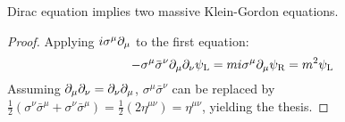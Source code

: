 \begin{proposition}{}{}
  Dirac equation implies two massive Klein-Gordon equations.
\end{proposition}

\begin{proofbox}
  \begin{proof}
    Applying $ i \sigma^\mu \partial_\mu $ to the first equation:
    \begin{equation*}
      - \sigma^\mu \bar{\sigma}^\nu \partial_\mu \partial_\nu \psi_\text{L} = m i \sigma^\mu \partial_\mu \psi_\text{R} = m^2 \psi_\text{L}
    \end{equation*}
    Assuming $ \partial_\mu \partial_\nu = \partial_\nu \partial_\mu $, $ \sigma^\mu \bar{\sigma}^\nu $ can be replaced by $ \frac{1}{2} (\sigma^\nu \bar{\sigma}^\mu + \sigma^\nu \bar{\sigma}^\mu) = \frac{1}{2} (2 \eta^{\mu \nu}) = \eta^{\mu \nu} $, yielding the thesis.
  \end{proof}
\end{proofbox}

